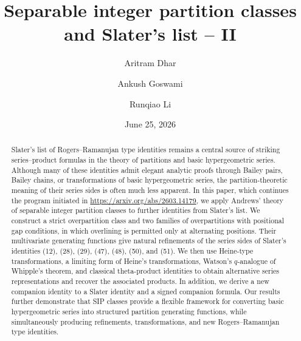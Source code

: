 \documentclass[11pt]{amsart}
\theoremstyle{definition}
\theoremstyle{remark}
\numberwithin{equation}{section}
\begin{document}
\title[Separable integer partition classes and Slater's list -- II]{Separable integer partition classes and Slater's list -- II}

\author{Aritram Dhar}
\address{Department of Mathematics, University of Florida, Gainesville, FL 32611, USA}

\author{Ankush Goswami}
\address{School of Mathematical and Statistical Sciences, University of Texas Rio Grande Valley, Edinburg, TX 78541, USA}

\author{Runqiao Li}
\address{School of Mathematical and Statistical Sciences, University of Texas Rio Grande Valley, Edinburg, TX 78541, USA}

\date{June 25, 2026}

\begin{abstract}
Slater's list of Rogers--Ramanujan type identities remains a central source of striking series--product formulas in the theory of partitions and basic hypergeometric series. Although many of these identities admit elegant analytic proofs through Bailey pairs, Bailey chains, or transformations of basic hypergeometric series, the partition-theoretic meaning of their series sides is often much less apparent. In this paper, which continues the program initiated in  \href{https://arxiv.org/abs/2603.14179}{https://arxiv.org/abs/2603.14179}, we apply Andrews' theory of separable integer partition classes to further identities from Slater's list. We construct a strict overpartition class and two families of overpartitions with positional gap conditions, in which overlining is permitted only at alternating positions. Their multivariate generating functions give natural refinements of the series sides of Slater's identities (12), (28), (29), (47), (48), (50), and (51). We then use Heine-type transformations, a limiting form of Heine's transformations, Watson's $q$-analogue of Whipple's theorem, and classical theta-product identities to obtain alternative series representations and recover the associated products. In addition, we derive a new companion identity to a Slater identity and a signed companion formula. Our results further demonstrate that SIP classes provide a flexible framework for converting basic hypergeometric series into structured partition generating functions, while simultaneously producing refinements, transformations, and new Rogers--Ramanujan type identities.
\end{abstract}
\end{document}
